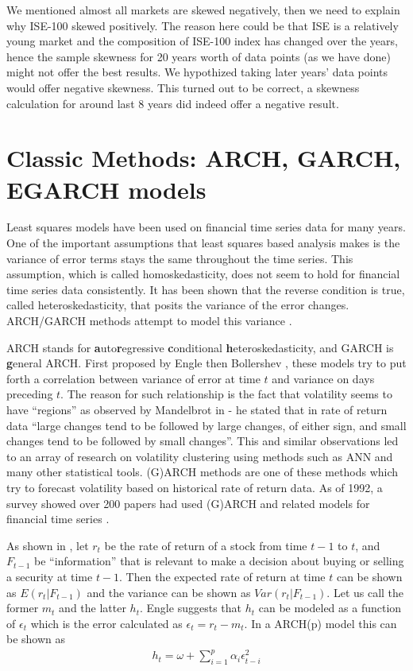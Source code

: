 We mentioned almost all markets are skewed negatively, then we need to explain
why ISE-100 skewed positively. The reason here could be that ISE is a relatively
young market and the composition of ISE-100 index has changed over the years,
hence the sample skewness for 20 years worth of data points (as we have done)
might not offer the best results. We hypothized taking later years' data points
would offer negative skewness. This turned out to be correct, a skewness
calculation for around last 8 years did indeed offer a negative result.

\section{Classic Methods: ARCH, GARCH, EGARCH models} 

Least squares models have been used on financial time series data for many
years. One of the important assumptions that least squares based analysis makes
is the variance of error terms stays the same throughout the time series. This
assumption, which is called homoskedasticity, does not seem to hold for
financial time series data consistently. It has been shown that the reverse
condition is true, called heteroskedasticity, that posits the variance of the
error changes. ARCH/GARCH methods attempt to model this variance \cite{engle}.

ARCH stands for \textbf{a}uto\textbf{r}egressive \textbf{c}onditional
\textbf{h}eteroskedasticity, and GARCH is \textbf{g}eneral ARCH. First proposed
by Engle \cite{engle3} then Bollershev \cite{bollershev}, these models try to
put forth a correlation between variance of error at time $t$ and variance on
days preceding $t$. The reason for such relationship is the fact that volatility
seems to have ``regions'' as observed by Mandelbrot in \cite{mandelbrot} - he
stated that in rate of return data ``large changes tend to be followed by large
changes, of either sign, and small changes tend to be followed by small
changes''. This and similar observations led to an array of research on
volatility clustering using methods such as ANN and many other statistical
tools. (G)ARCH methods are one of these methods which try to forecast volatility
based on historical rate of return data. As of 1992, a survey showed over 200
papers had used (G)ARCH and related models for financial time series
\cite{engle2}.

As shown in \cite{engle2}, let $r_t$ be the rate of return of a stock from time
$t-1$ to $t$, and $F_{t-1}$ be ``information'' that is relevant to make a
decision about buying or selling a security at time $t-1$. Then the expected
rate of return at time $t$ can be shown as $E(r_t|F_{t-1})$ and the variance can
be shown as $Var(r_t|F_{t-1})$. Let us call the former $m_t$ and the latter
$h_t$. Engle \cite{engle3} suggests that $h_t$ can be modeled as a function of
$\epsilon_t$ which is the error calculated as $\epsilon_t = r_t - m_t$. In a
ARCH(p) model this can be shown as 
\begin{eqnarray*}
h_t = \omega + \sum_{i=1}^p \alpha_i\epsilon_{t-i}^2
\end{eqnarray*}

